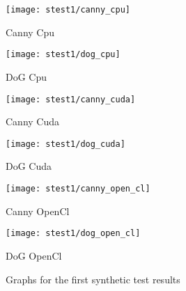 \begin{figure}[H]
\centering
\begin{minipage}[t]{.49\textwidth}
\centering
\texttt{[image: stest1/canny\_cpu]}
\addtocounter{figure}{-1}
\captionsetup{labelformat=empty}
\caption[]{Canny Cpu}
\end{minipage}
\begin{minipage}[t]{.49\textwidth}
\centering
\texttt{[image: stest1/dog\_cpu]}
\addtocounter{figure}{-1}
\captionsetup{labelformat=empty}
\caption[]{DoG Cpu}
\end{minipage}
\begin{minipage}[t]{.49\textwidth}
\centering
\texttt{[image: stest1/canny\_cuda]}
\addtocounter{figure}{-1}
\captionsetup{labelformat=empty}
\caption[]{Canny Cuda}
\end{minipage}
\begin{minipage}[t]{.49\textwidth}
\centering
\texttt{[image: stest1/dog\_cuda]}
\addtocounter{figure}{-1}
\captionsetup{labelformat=empty}
\caption[]{DoG Cuda}
\end{minipage}
\begin{minipage}[t]{.49\textwidth}
\centering
\texttt{[image: stest1/canny\_open\_cl]}
\addtocounter{figure}{-1}
\captionsetup{labelformat=empty}
\caption[]{Canny OpenCl}
\end{minipage}
\begin{minipage}[t]{.49\textwidth}
\centering
\texttt{[image: stest1/dog\_open\_cl]}
\addtocounter{figure}{-1}
\captionsetup{labelformat=empty}
\caption[]{DoG OpenCl}
\end{minipage}
\caption{Graphs for the first synthetic test results}
\label{fig:test1s}
\end{figure}


